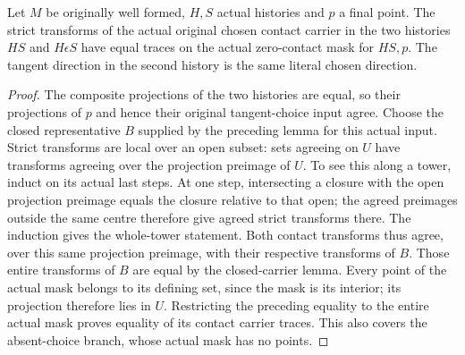 \begin{theorem}
\label{hir:original-interior-zero-contact-carrier}
\leanok
{}
Let $M$ be originally well formed, $H,S$ actual histories and $p$ a final
point.  The strict transforms of the actual original chosen contact carrier
in the two histories $HS$ and $H\epsilon S$ have equal traces on the actual
zero-contact mask for $HS,p$.  The tangent direction in the second history
is the same literal chosen direction.
\end{theorem}
\begin{proof}
The composite projections of the two histories are equal, so their
projections of $p$ and hence their original tangent-choice input agree.
Choose the closed representative $B$ supplied by the preceding lemma for
this actual input.  Strict transforms are local over an open subset:
sets agreeing on $U$ have transforms agreeing over the projection preimage
of $U$.  To see this along a tower, induct on its actual last steps.  At
one step, intersecting a closure with the open projection preimage equals
the closure relative to that open; the agreed preimages outside the same
centre therefore give agreed strict transforms there.  The induction gives
the whole-tower statement.  Both contact transforms thus agree, over this
same projection preimage, with their respective transforms of $B$.
Those entire transforms of $B$ are equal by the closed-carrier lemma.
Every point of the actual mask belongs to its defining set, since the mask
is its interior; its projection therefore lies in $U$.  Restricting the
preceding equality to the entire actual mask proves equality of its contact
carrier traces.  This also covers the absent-choice branch, whose actual
mask has no points.
\end{proof}

